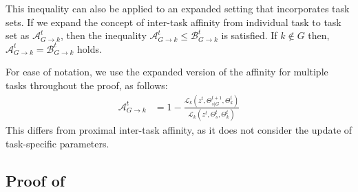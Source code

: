 This inequality can also be applied to an expanded setting that incorporates task sets. If we expand the concept of inter-task affinity from individual task to task set as $\mathcal{A}^t_{G \rightarrow k}$, then the inequality $\mathcal{A}^t_{G \rightarrow k} \leq \mathcal{B}^t_{G \rightarrow k}$ is satisfied. If $k \notin G$ then, $\mathcal{A}^t_{G \rightarrow k} = \mathcal{B}^t_{G \rightarrow k}$ holds.

For ease of notation, we use the expanded version of the affinity for multiple tasks throughout the proof, as follows:
\begin{align}
    \mathcal{A}^t_{G\rightarrow k} &= 1- \frac{\mathcal{L}_k(z^t, \Theta_{s|G}^{t+1}, \Theta_k^t)}{\mathcal{L}_k(z^t, \Theta_{s}^{t}, \Theta_k^t)}
    \label{Append:expanded_affinity}
\end{align}
This differs from proximal inter-task affinity, as it does not consider the update of task-specific parameters.

\subsection{Proof of }
\label{Append:theorem1}

